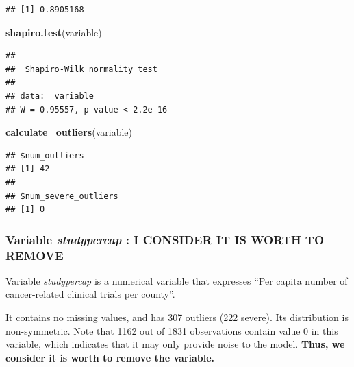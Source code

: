 \documentclass[
]{article}
\newenvironment{Shaded}{\begin{snugshade}}{\end{snugshade}}
\newcommand{\FunctionTok}[1]{\textcolor[rgb]{0.13,0.29,0.53}{\textbf{#1}}}
\newcommand{\NormalTok}[1]{#1}
\newcommand{\OtherTok}[1]{\textcolor[rgb]{0.56,0.35,0.01}{#1}}
\newcommand{\SpecialCharTok}[1]{\textcolor[rgb]{0.81,0.36,0.00}{\textbf{#1}}}
\begin{document}
\begin{verbatim}
## [1] 0.8905168
\end{verbatim}

\begin{Shaded}
\begin{Highlighting}[]
\FunctionTok{shapiro.test}\NormalTok{(variable)}
\end{Highlighting}
\end{Shaded}

\begin{verbatim}
## 
##  Shapiro-Wilk normality test
## 
## data:  variable
## W = 0.95557, p-value < 2.2e-16
\end{verbatim}

\begin{Shaded}
\begin{Highlighting}[]
\FunctionTok{calculate\_outliers}\NormalTok{(variable)}
\end{Highlighting}
\end{Shaded}

\begin{verbatim}
## $num_outliers
## [1] 42
## 
## $num_severe_outliers
## [1] 0
\end{verbatim}

\subsubsection{\texorpdfstring{Variable \emph{studypercap} : I CONSIDER
IT IS WORTH TO
REMOVE}{Variable studypercap : I CONSIDER IT IS WORTH TO REMOVE}}\label{variable-studypercap-i-consider-it-is-worth-to-remove}

Variable \emph{studypercap} is a numerical variable that expresses ``Per
capita number of cancer-related clinical trials per county''.

It contains no missing values, and has 307 outliers (222 severe). Its
distribution is non-symmetric. Note that 1162 out of 1831 observations
contain value 0 in this variable, which indicates that it may only
provide noise to the model. \textbf{Thus, we consider it is worth to
remove the variable. }

\begin{Shaded}
\end{Shaded}
\end{document}
